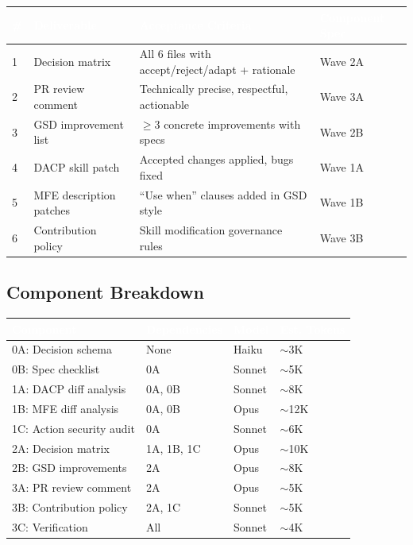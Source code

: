 \documentclass[11pt,letterpaper]{article}
\newcommand{\tableheader}[1]{\textbf{\sffamily\textcolor{white}{#1}}}
\begin{document}
\begin{center}
\begin{tabularx}{\textwidth}{C{0.5cm}L{4cm}XL{2.5cm}}
\toprule
{}
\tableheader{\#} & \tableheader{Deliverable} & \tableheader{Acceptance Criteria} & \tableheader{Component Spec} \\
 & Decision matrix & All 6 files with accept/reject/adapt + rationale & Wave 2A \\
2 & PR review comment & Technically precise, respectful, actionable & Wave 3A \\
3 & GSD improvement list & $\geq$3 concrete improvements with specs & Wave 2B \\
4 & DACP skill patch & Accepted changes applied, bugs fixed & Wave 1A \\
5 & MFE description patches & ``Use when'' clauses added in GSD style & Wave 1B \\
6 & Contribution policy & Skill modification governance rules & Wave 3B \\
\bottomrule
\end{tabularx}
\end{center}

\subsection{Component Breakdown}

\begin{center}
\begin{tabularx}{\textwidth}{L{3.5cm}L{2.5cm}C{1.5cm}C{2cm}}
\toprule
{}
\tableheader{Component} & \tableheader{Dependencies} & \tableheader{Model} & \tableheader{Est. Tokens} \\
\midrule
0A: Decision schema & None & Haiku & $\sim$3K \\
0B: Spec checklist & 0A & Sonnet & $\sim$5K \\
1A: DACP diff analysis & 0A, 0B & Sonnet & $\sim$8K \\
1B: MFE diff analysis & 0A, 0B & Opus & $\sim$12K \\
1C: Action security audit & 0A & Sonnet & $\sim$6K \\
2A: Decision matrix & 1A, 1B, 1C & Opus & $\sim$10K \\
2B: GSD improvements & 2A & Opus & $\sim$8K \\
3A: PR review comment & 2A & Opus & $\sim$5K \\
3B: Contribution policy & 2A, 1C & Sonnet & $\sim$5K \\
3C: Verification & All & Sonnet & $\sim$4K \\
\bottomrule
\end{tabularx}
\end{center}
\end{document}

